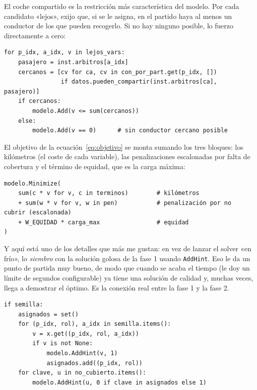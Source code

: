 \documentclass[11pt,a4paper,spanish]{book}
\numberwithin{equation}{chapter}
\numberwithin{figure}{chapter}
\numberwithin{table}{chapter}
\begin{document}
El coche compartido es la restricción más característica del modelo. Por cada candidato «lejos», exijo que, si se le asigna, en el partido haya al menos un conductor de los que pueden recogerlo. Si no hay ninguno posible, lo fuerzo directamente a cero:

\begin{lstlisting}[caption={Restricción de coche compartido: un «lejos» necesita un conductor cercano en el mismo partido (\texttt{cpsat.py}).},label={lst:cpsat-coche}]
for p_idx, a_idx, v in lejos_vars:
    pasajero = inst.arbitros[a_idx]
    cercanos = [cv for ca, cv in con_por_part.get(p_idx, [])
                if datos.pueden_compartir(inst.arbitros[ca], pasajero)]
    if cercanos:
        modelo.Add(v <= sum(cercanos))
    else:
        modelo.Add(v == 0)      # sin conductor cercano posible
\end{lstlisting}

El objetivo de la ecuación~\eqref{eq:objetivo} se monta sumando los tres bloques: los kilómetros (el coste de cada variable), las penalizaciones escalonadas por falta de cobertura y el término de equidad, que es la carga máxima:

\begin{lstlisting}[caption={Función objetivo del modelo CP-SAT (\texttt{cpsat.py}).},label={lst:cpsat-objetivo}]
modelo.Minimize(
    sum(c * v for v, c in terminos)        # kilómetros
    + sum(w * v for v, w in pen)           # penalización por no cubrir (escalonada)
    + W_EQUIDAD * carga_max                # equidad
)
\end{lstlisting}

Y aquí está uno de los detalles que más me gustan: en vez de lanzar el solver «en frío», lo \emph{siembro} con la solución golosa de la fase 1 usando \texttt{AddHint}. Eso le da un punto de partida muy bueno, de modo que cuando se acaba el tiempo (le doy un límite de segundos configurable) ya tiene una solución de calidad y, muchas veces, llega a demostrar el óptimo. Es la conexión real entre la fase 1 y la fase 2.

\begin{lstlisting}[caption={Siembra del solver con la solución golosa mediante \texttt{AddHint} (\texttt{cpsat.py}).},label={lst:cpsat-hint}]
if semilla:
    asignados = set()
    for (p_idx, rol), a_idx in semilla.items():
        v = x.get((p_idx, rol, a_idx))
        if v is not None:
            modelo.AddHint(v, 1)
            asignados.add((p_idx, rol))
    for clave, u in no_cubierto.items():
        modelo.AddHint(u, 0 if clave in asignados else 1)
\end{lstlisting}
\end{document}
